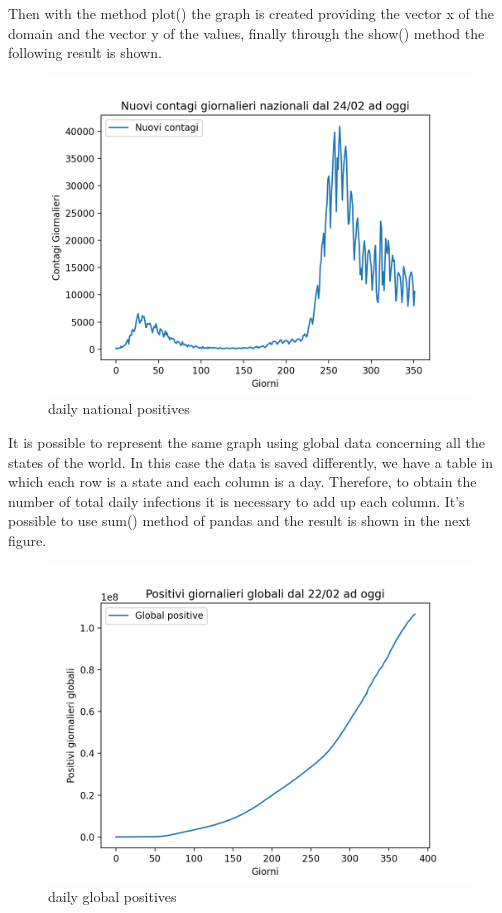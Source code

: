 \documentclass[12pt]{report}
\begin{document}
Then with the method plot() the graph is created providing the vector x of the domain and the vector y of the values, finally through the show() method the following result is shown.
\begin{figure}[h!]
    \centering
    \includegraphics[width=14cm]{Pictures/covid2.png}
    \caption{daily national positives}
\end{figure}

It is possible to represent the same graph using global data concerning all the states of the world. In this case the data is saved differently, we have a table in which each row is a state and each column is a day. Therefore, to obtain the number of total daily infections it is necessary to add up each column. It's possible to use sum() method of pandas and the result is shown in the next figure.

\begin{figure}[h!]
    \centering
    \includegraphics[width=14cm]{Pictures/covid4.png}
    \caption{daily global positives}
\end{figure}
\end{document}
